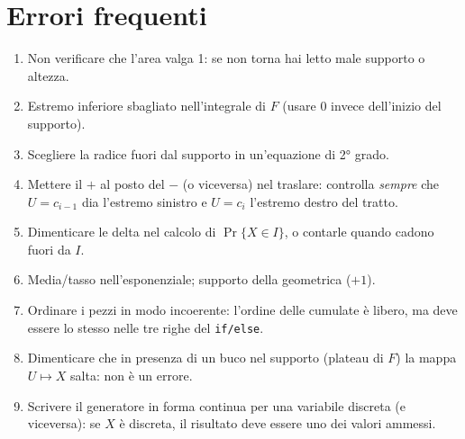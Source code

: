 \section{Errori frequenti}
\begin{attenzione}
\begin{enumerate}[leftmargin=*]
\item Non verificare che l'area valga 1: se non torna hai letto male supporto o altezza.
\item Estremo inferiore sbagliato nell'integrale di $F$ (usare $0$ invece dell'inizio del supporto).
\item Scegliere la radice fuori dal supporto in un'equazione di 2° grado.
\item Mettere il $+$ al posto del $-$ (o viceversa) nel traslare: controlla \emph{sempre} che $U=c_{i-1}$ dia l'estremo sinistro e $U=c_i$ l'estremo destro del tratto.
\item Dimenticare le delta nel calcolo di $\Pr\{X\in I\}$, o contarle quando cadono fuori da $I$.
\item Media/tasso nell'esponenziale; supporto della geometrica ($+1$).
\item Ordinare i pezzi in modo incoerente: l'ordine delle cumulate è libero, ma deve essere lo stesso nelle tre righe del \texttt{if/else}.
\item Dimenticare che in presenza di un buco nel supporto (plateau di $F$) la mappa $U\mapsto X$ salta: non è un errore.
\item Scrivere il generatore in forma \guillemotleft{}continua\guillemotright{} per una variabile discreta (e viceversa): se $X$ è discreta, il risultato deve essere uno dei valori ammessi.
\end{enumerate}
\end{attenzione}
